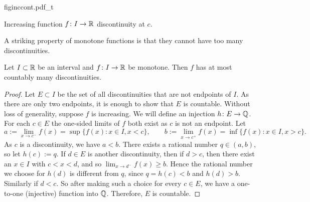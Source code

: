 \begin{myfigureht}
{figinccont.pdf_t}
\caption{Increasing function $f \colon I \to {\mathbb{R}}$ discontinuity at
$c$.\label{fig:figinccont}}
\end{myfigureht}

A striking property of monotone functions is that they cannot have
too many discontinuities.

\begin{cor} \label{cor:monotcountcont}
Let $I \subset {\mathbb{R}}$ be an interval and
$f \colon I \to {\mathbb{R}}$ be monotone.  Then $f$ has at most
countably many discontinuities.
\end{cor}

\begin{proof}
Let $E \subset I$ be the set of all discontinuities
that are not endpoints of $I$.  As there are
only two endpoints, it is enough to show that $E$ is countable.
Without loss of generality, suppose $f$ is increasing.
We will define an injection $h \colon E \to {\mathbb{Q}}$.
For each $c \in E$
the one-sided limits of $f$ both exist as $c$ is not an endpoint.
Let
\begin{equation*}
a := \lim_{x \to c^-} f(x) = \sup \bigl\{ f(x) : x \in I, x < c \bigr\} ,
\qquad
b := \lim_{x \to c^+} f(x) = \inf \bigl\{ f(x) : x \in I, x > c \bigr\} .
\end{equation*}
As $c$ is a discontinuity, we have $a < b$.  
There exists a rational number $q \in (a,b)$, so let $h(c) := q$.
If $d \in E$ is another discontinuity, then if $d > c$, then there
exist an $x \in I$ with $c < x < d$, and so $\lim_{x \to d^-} f(x) \geq b$.
Hence the rational number we choose for $h(d)$ is different from $q$,
since $q=h(c) < b$ and $h(d) > b$.
Similarly if $d < c$.  So after making such a choice for
every $c \in E$, we have a 
one-to-one (injective) function into ${\mathbb{Q}}$.  Therefore, $E$ is countable.
\end{proof}

